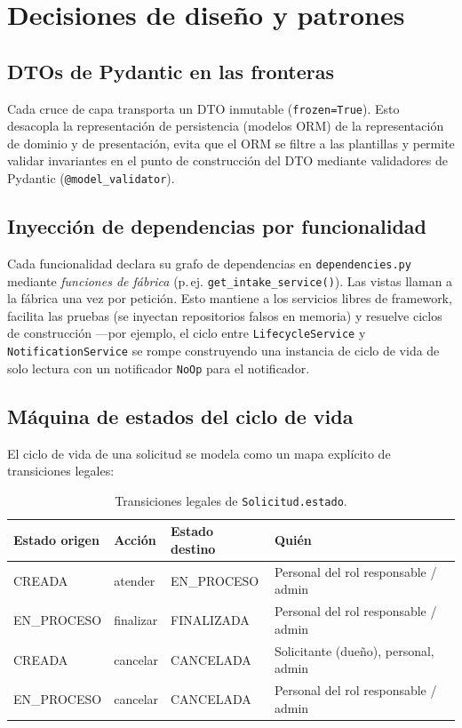\documentclass[12pt,letterpaper]{report}
\begin{document}
\chapter{Decisiones de diseño y patrones}

\section{DTOs de Pydantic en las fronteras}

Cada cruce de capa transporta un DTO inmutable (\texttt{frozen=True}). Esto
desacopla la representación de persistencia (modelos ORM) de la representación de
dominio y de presentación, evita que el ORM se filtre a las plantillas y permite
validar invariantes en el punto de construcción del DTO mediante validadores de
Pydantic (\texttt{@model\_validator}).

\section{Inyección de dependencias por funcionalidad}

Cada funcionalidad declara su grafo de dependencias en \texttt{dependencies.py}
mediante \emph{funciones de fábrica} (p.\,ej.
\texttt{get\_intake\_service()}). Las vistas llaman a la fábrica una vez por
petición. Esto mantiene a los servicios libres de framework, facilita las
pruebas (se inyectan repositorios falsos en memoria) y resuelve ciclos de
construcción —por ejemplo, el ciclo entre \texttt{LifecycleService} y
\texttt{NotificationService} se rompe construyendo una instancia de ciclo de vida
de solo lectura con un notificador \texttt{NoOp} para el notificador.

\section{Máquina de estados del ciclo de vida}

El ciclo de vida de una solicitud se modela como un mapa explícito de
transiciones legales:

\begin{table}[H]
\centering
\caption{Transiciones legales de \texttt{Solicitud.estado}.}
\begin{tabularx}{\textwidth}{L{3.6cm} L{2.8cm} L{3.6cm} X}
\toprule
\textbf{Estado origen} & \textbf{Acción} & \textbf{Estado destino} & \textbf{Quién} \\
\midrule
CREADA      & atender    & EN\_PROCESO  & Personal del rol responsable / admin \\
EN\_PROCESO & finalizar  & FINALIZADA   & Personal del rol responsable / admin \\
CREADA      & cancelar   & CANCELADA    & Solicitante (dueño), personal, admin \\
EN\_PROCESO & cancelar   & CANCELADA    & Personal del rol responsable / admin \\
\bottomrule
\end{tabularx}
\end{table}
\end{document}
